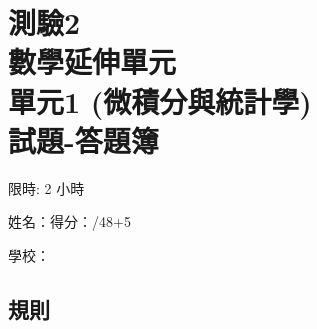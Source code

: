\documentclass[12pt]{article}
\begin{document}
    \thispagestyle{empty}

    \centering 

    \section*{測驗2\\數學延伸單元\\單元1 (微積分與統計學)\\試題-答題簿}

    限時: 2 小時

    姓名：\hrulefill \hfill 得分：\hrulefill/48+5

    學校：\hrulefill

    \raggedright

    \subsection*{規則}
\end{document}
